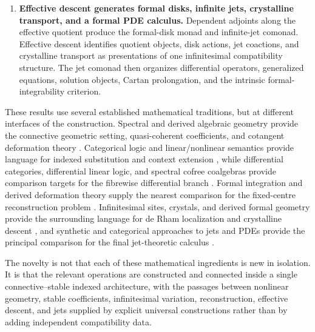 \begin{enumerate}
    \item
    \textbf{Effective descent generates formal disks, infinite jets,
    crystalline transport, and a formal PDE calculus.}
    Dependent adjoints along the effective quotient produce the formal-disk
    monad and infinite-jet comonad.  Effective descent identifies quotient
    objects, disk actions, jet coactions, and crystalline transport as
    presentations of one infinitesimal compatibility structure.  The jet
    comonad then organizes differential operators, generalized equations,
    solution objects, Cartan prolongation, and the intrinsic
    formal-integrability criterion.

\end{enumerate}

These results use several established mathematical traditions, but at
different interfaces of the construction.  Spectral and derived algebraic
geometry provide the connective geometric setting, quasi-coherent
coefficients, and cotangent deformation theory
\cite{LurieDAGIV,LurieDAGIX,LurieHigherAlgebra,LurieSAG}.  Categorical logic
and linear/nonlinear semantics provide language for indexed substitution and
context extension
\cite{JacobsCategoricalLogic,Benton1995LNL}, while differential categories,
differential linear logic, and spectral cofree coalgebras provide comparison
targets for the fibrewise differential branch
\cite{BluteCockettSeely2006Differential,EhrhardRegnier2003Differential,Lemay2021Coderelictions,BachmannBurklund2026Coalgebras}.
Formal integration and derived deformation theory supply the nearest
comparison for the fixed-centre reconstruction problem
\cite{LurieDAGX,BrantnerMagidsonNuitenFormalIntegration}.  Infinitesimal
sites, crystals, and derived formal geometry provide the surrounding
language for de Rham localization and crystalline descent
\cite{Ogus1975InfinitesimalSite,GaitsgoryRozenblyum2014Crystals,GaitsgoryRozenblyumStudyII},
and synthetic and categorical approaches to jets and PDEs provide the
principal comparison for the final jet-theoretic calculus
\cite{Kock1980,Marvan1986,KhavkineSchreiber2017,GiotopoulosKhavkineSatiSchreiber2026}.

The novelty is not that each of these mathematical ingredients is new in
isolation.  It is that the relevant operations are constructed and
connected inside a single connective--stable indexed architecture, with the
passages between nonlinear geometry, stable coefficients, infinitesimal
variation, reconstruction, effective descent, and jets supplied by explicit
universal constructions rather than by adding independent compatibility
data.

